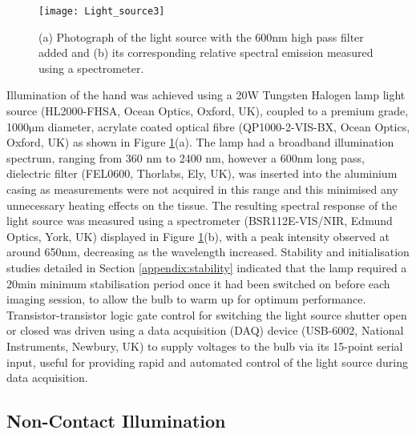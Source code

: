 \documentclass[twoside]{bhamthesis}
\theoremstyle{definition}
\begin{document}
\begin{figure}[!ht]
\centering
  \texttt{[image: Light\_source3]}
\caption{(a) Photograph of the light source with the 600nm high pass filter added and (b) its corresponding relative spectral emission measured using a spectrometer.}
  \label{fig:Light_source3}
\end{figure}

Illumination of the hand was achieved using a 20W Tungsten Halogen lamp light source (HL2000-FHSA, Ocean Optics, Oxford, UK), coupled to a premium grade, 1000$\mathrm{\mu}$m diameter, acrylate coated optical fibre (QP1000-2-VIS-BX,  Ocean Optics, Oxford, UK) as shown in Figure \ref{fig:Light_source3}(a). The lamp had a broadband illumination spectrum, ranging from 360 nm to 2400 nm, however a 600nm long pass, dielectric filter (FEL0600, Thorlabs, Ely, UK), was inserted into the aluminium casing as measurements were not acquired in this range and this minimised any unnecessary heating effects on the tissue. The resulting spectral response of the light source was measured using a spectrometer (BSR112E-VIS/NIR, Edmund Optics, York, UK) displayed in Figure \ref{fig:Light_source3}(b), with a peak intensity observed at around 650nm, decreasing as the wavelength increased. Stability and initialisation studies detailed in Section \ref{appendix:stability} indicated that the lamp required a 20min  minimum stabilisation period once it had been switched on before each imaging session, to allow the bulb to warm up for optimum performance. Transistor-transistor logic gate control for switching the light source shutter open or closed was driven using a data acquisition (DAQ) device (USB-6002, National Instruments, Newbury, UK) to supply voltages to the bulb via its 15-point serial input, useful for providing rapid and automated control of the light source during data acquisition.

\subsection{Non-Contact Illumination}
\end{document}
